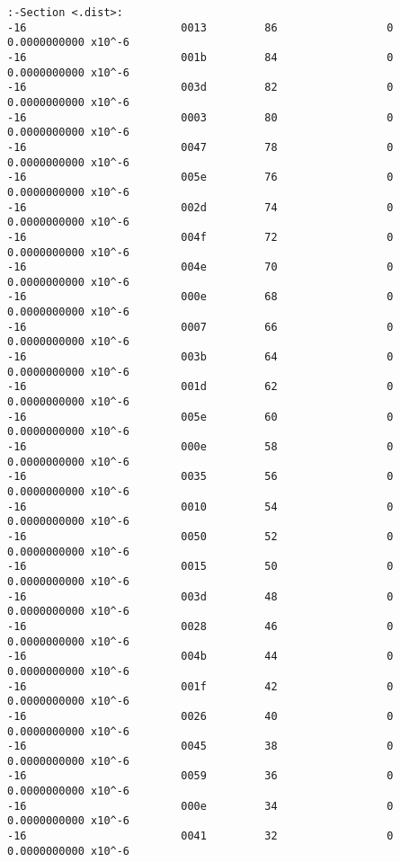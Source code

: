 \begin{verbatim}
:-Section <.dist>:  
-16                        0013         86                 0              0.0000000000 x10^-6 
-16                        001b         84                 0              0.0000000000 x10^-6 
-16                        003d         82                 0              0.0000000000 x10^-6 
-16                        0003         80                 0              0.0000000000 x10^-6 
-16                        0047         78                 0              0.0000000000 x10^-6 
-16                        005e         76                 0              0.0000000000 x10^-6 
-16                        002d         74                 0              0.0000000000 x10^-6 
-16                        004f         72                 0              0.0000000000 x10^-6 
-16                        004e         70                 0              0.0000000000 x10^-6 
-16                        000e         68                 0              0.0000000000 x10^-6 
-16                        0007         66                 0              0.0000000000 x10^-6 
-16                        003b         64                 0              0.0000000000 x10^-6 
-16                        001d         62                 0              0.0000000000 x10^-6 
-16                        005e         60                 0              0.0000000000 x10^-6 
-16                        000e         58                 0              0.0000000000 x10^-6 
-16                        0035         56                 0              0.0000000000 x10^-6 
-16                        0010         54                 0              0.0000000000 x10^-6 
-16                        0050         52                 0              0.0000000000 x10^-6 
-16                        0015         50                 0              0.0000000000 x10^-6 
-16                        003d         48                 0              0.0000000000 x10^-6 
-16                        0028         46                 0              0.0000000000 x10^-6 
-16                        004b         44                 0              0.0000000000 x10^-6 
-16                        001f         42                 0              0.0000000000 x10^-6 
-16                        0026         40                 0              0.0000000000 x10^-6 
-16                        0045         38                 0              0.0000000000 x10^-6 
-16                        0059         36                 0              0.0000000000 x10^-6 
-16                        000e         34                 0              0.0000000000 x10^-6 
-16                        0041         32                 0              0.0000000000 x10^-6 

\end{verbatim}
